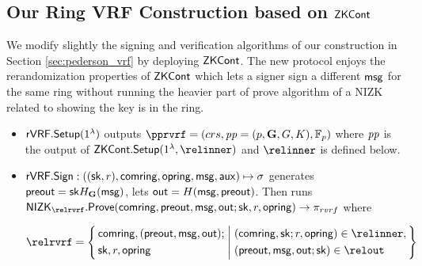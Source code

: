 

\subsection{Our Ring VRF Construction based on $ {\mathsf{ZKCont}} $}

\label{subsec:rvrf_faster}
We modify slightly the signing and verification algorithms of our construction in Section \ref{sec:pederson_vrf} by deploying $ {\mathsf{ZKCont}} $. 
The new protocol enjoys the rerandomization properties of $ {\mathsf{ZKCont}} $ which lets a signer sign a 
different $ \mathsf{msg} $ for the same ring without running the  heavier part of prove algorithm of a NIZK related to showing the key is in the ring.  
\begin{itemize}
	\item $ {\mathsf{rVRF}}.{\mathsf{Setup}}(1^\lambda)   $ outputs $ \pprvrf = (crs, \pp = (p, \grE,\genG, \genB), \F_p) $ where $ \mathit{pp} $ is the output of $ \ZKCont.\Setup(1^\secparam, \relinner) $ and $\relinner$ is defined below.
	\item ${\mathsf{rVRF}}.{\mathsf{Sign}} : ((\mathsf{sk},r),\mathsf{comring}, \mathsf{opring},\mathsf{msg},\mathsf{aux}) \mapsto \sigma$ generates $ {\mathsf{preout}} = \mathsf{sk} H_{\mathbf{G}}(\mathsf{msg}) $, lets $ {\mathsf{out}} = H(\mathsf{msg}, {\mathsf{preout}}) $. Then runs $ \NIZK_{\relrvrf}.\Prove(\comring,\PreOut, \msg, \Out; \sk,r,\openring)\rightarrow \pi_{rvrf}$ where
	
{\begin{scriptsize}
		$$ \relrvrf = \Setst{
			\begin{aligned}
				&\comring, (\PreOut,\msg, \Out); \\
				&\sk,r, \openring
			\end{aligned}
		}{
			\begin{aligned}
				& (\comring,\sk;r,\openring) \in \relinner, \\
				& (\PreOut, \msg, \Out; \sk) \in \relout
		\end{aligned}	}$$
	\end{scriptsize}
}   
	

\end{itemize}
